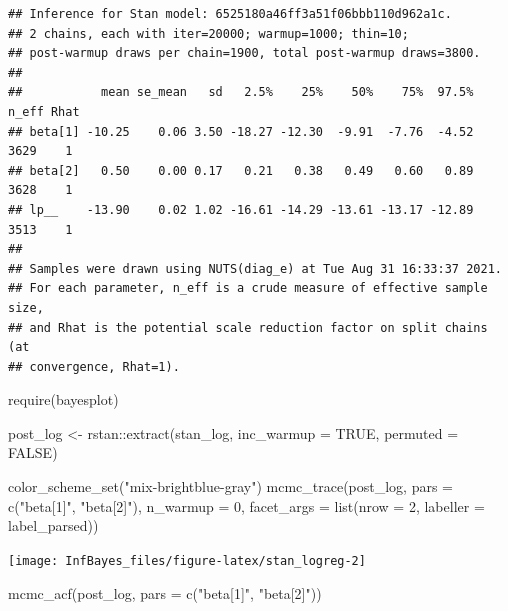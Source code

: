 \documentclass[
]{book}
\newenvironment{Shaded}{\begin{snugshade}}{\end{snugshade}}
\newcommand{\AttributeTok}[1]{\textcolor[rgb]{0.77,0.63,0.00}{#1}}
\newcommand{\ConstantTok}[1]{\textcolor[rgb]{0.00,0.00,0.00}{#1}}
\newcommand{\DecValTok}[1]{\textcolor[rgb]{0.00,0.00,0.81}{#1}}
\newcommand{\FunctionTok}[1]{\textcolor[rgb]{0.00,0.00,0.00}{#1}}
\newcommand{\NormalTok}[1]{#1}
\newcommand{\OtherTok}[1]{\textcolor[rgb]{0.56,0.35,0.01}{#1}}
\newcommand{\SpecialCharTok}[1]{\textcolor[rgb]{0.00,0.00,0.00}{#1}}
\newcommand{\StringTok}[1]{\textcolor[rgb]{0.31,0.60,0.02}{#1}}
\begin{document}
\begin{verbatim}
## Inference for Stan model: 6525180a46ff3a51f06bbb110d962a1c.
## 2 chains, each with iter=20000; warmup=1000; thin=10; 
## post-warmup draws per chain=1900, total post-warmup draws=3800.
## 
##           mean se_mean   sd   2.5%    25%    50%    75%  97.5% n_eff Rhat
## beta[1] -10.25    0.06 3.50 -18.27 -12.30  -9.91  -7.76  -4.52  3629    1
## beta[2]   0.50    0.00 0.17   0.21   0.38   0.49   0.60   0.89  3628    1
## lp__    -13.90    0.02 1.02 -16.61 -14.29 -13.61 -13.17 -12.89  3513    1
## 
## Samples were drawn using NUTS(diag_e) at Tue Aug 31 16:33:37 2021.
## For each parameter, n_eff is a crude measure of effective sample size,
## and Rhat is the potential scale reduction factor on split chains (at 
## convergence, Rhat=1).
\end{verbatim}

\begin{Shaded}
\begin{Highlighting}[]
\FunctionTok{require}\NormalTok{(bayesplot)}

\NormalTok{post\_log }\OtherTok{\textless{}{-}}\NormalTok{ rstan}\SpecialCharTok{::}\FunctionTok{extract}\NormalTok{(stan\_log, }\AttributeTok{inc\_warmup =} \ConstantTok{TRUE}\NormalTok{, }\AttributeTok{permuted =} \ConstantTok{FALSE}\NormalTok{)}


\FunctionTok{color\_scheme\_set}\NormalTok{(}\StringTok{"mix{-}brightblue{-}gray"}\NormalTok{)}
\FunctionTok{mcmc\_trace}\NormalTok{(post\_log,  }\AttributeTok{pars =} \FunctionTok{c}\NormalTok{(}\StringTok{"beta[1]"}\NormalTok{, }\StringTok{"beta[2]"}\NormalTok{), }\AttributeTok{n\_warmup =} \DecValTok{0}\NormalTok{,}
                \AttributeTok{facet\_args =} \FunctionTok{list}\NormalTok{(}\AttributeTok{nrow =} \DecValTok{2}\NormalTok{, }\AttributeTok{labeller =}\NormalTok{ label\_parsed))}
\end{Highlighting}
\end{Shaded}

\begin{center}\texttt{[image: InfBayes\_files/figure-latex/stan\_logreg-2]} \end{center}

\begin{Shaded}
\begin{Highlighting}[]
\FunctionTok{mcmc\_acf}\NormalTok{(post\_log, }\AttributeTok{pars =} \FunctionTok{c}\NormalTok{(}\StringTok{"beta[1]"}\NormalTok{, }\StringTok{"beta[2]"}\NormalTok{))}
\end{Highlighting}
\end{Shaded}
\end{document}
